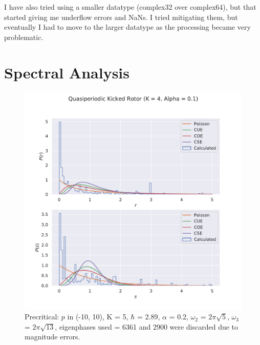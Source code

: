 \documentclass[12pt]{article}
\begin{document}
\begin{enumerate}
    I have also tried using a smaller datatype (complex32 over complex64),
    but that started giving me underflow errors and NaNs. I tried mitigating
    them, but eventually I had to move to the larger datatype as the processing
    became very problematic.
\end{enumerate}

\section{Spectral Analysis}

\begin{figure}[h]
    \includegraphics[width=\linewidth]{quasiperiodic_kickedrotor_spectrum_N10_precritical}
    \caption{Precritical: $p$ in (-10, 10), K = 5, $\hbar$ = 2.89, $\alpha$ = 0.2,
    $\omega_2$ = $2\pi\sqrt{5}$, $\omega_3$ = $2\pi\sqrt{13}$, eigenphases
    used = 6361 and 2900 were discarded due to magnitude errors.}
    \centering
\end{figure}
\end{document}

